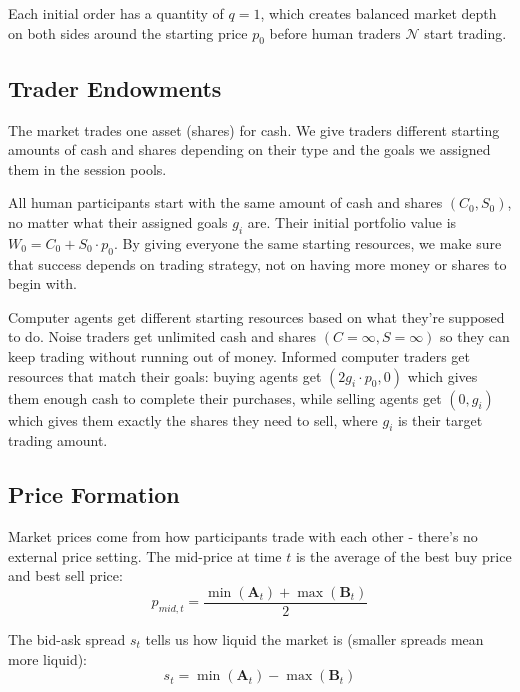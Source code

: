 Each initial order has a quantity of $q = 1$, which creates balanced market depth on both sides around the starting price $p_0$ before human traders $\mathcal{N}$ start trading.

\subsection{Trader Endowments}

The market trades one asset (shares) for cash. We give traders different starting amounts of cash and shares depending on their type and the goals we assigned them in the session pools.

All human participants start with the same amount of cash and shares $(C_0, S_0)$, no matter what their assigned goals $g_i$ are. Their initial portfolio value is $W_0 = C_0 + S_0 \cdot p_0$. By giving everyone the same starting resources, we make sure that success depends on trading strategy, not on having more money or shares to begin with.

Computer agents get different starting resources based on what they're supposed to do. Noise traders get unlimited cash and shares $(C = \infty, S = \infty)$ so they can keep trading without running out of money. Informed computer traders get resources that match their goals: buying agents get $(2g_i \cdot p_0, 0)$ which gives them enough cash to complete their purchases, while selling agents get $(0, g_i)$ which gives them exactly the shares they need to sell, where $g_i$ is their target trading amount.

\subsection{Price Formation}

Market prices come from how participants trade with each other - there's no external price setting. The mid-price at time $t$ is the average of the best buy price and best sell price:
\begin{equation}
p_{mid,t} = \frac{\min(\mathbf{A}_t) + \max(\mathbf{B}_t)}{2}
\end{equation}

The bid-ask spread $s_t$ tells us how liquid the market is (smaller spreads mean more liquid):
\begin{equation}
s_t = \min(\mathbf{A}_t) - \max(\mathbf{B}_t)
\end{equation}

